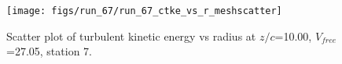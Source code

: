 \begin{figure}[H]
\centering
\texttt{[image: figs/run\_67/run\_67\_ctke\_vs\_r\_meshscatter]}
\caption{Scatter plot of turbulent kinetic energy vs radius at $z/c$=10.00, $V_{free}$=27.05, station 7.}
\end{figure}


